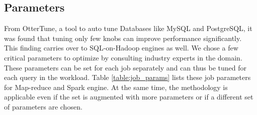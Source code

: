 \subsection{Parameters}



From OtterTune\cite{vanaken}, a tool to auto tune Databases like MySQL and PostgreSQL, it was found that tuning only few knobs can improve performance significantly. This finding carries over to SQL-on-Hadoop engines as well. We chose a few critical parameters to optimize by consulting industry experts in the domain. These parameters can be set for each job separately and can thus be tuned for each query in the workload. Table \ref{table:job_params} lists these job parameters for Map-reduce and Spark engine. At the same time, the methodology is applicable even if the set is augmented with more parameters or if a different set of parameters are chosen. 

